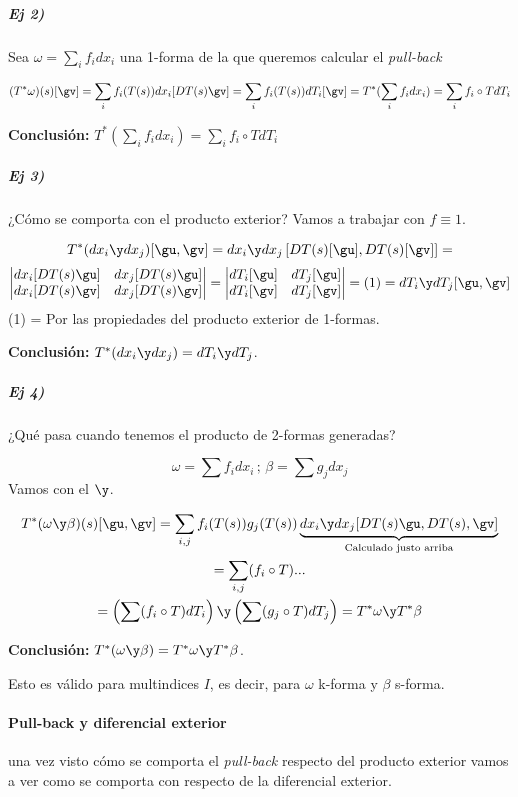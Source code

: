 \subparagraph{Ej 2)} Sea $\omega = \sum_i f_i dx_i$ una 1-forma de la que queremos calcular el \emph{pull-back}

\[ 
 (T^{\ast} \omega )(s)[\gv]= \sum_i f_i(T(s))dx_i [DT(s)\gv] = \sum_if_i(T(s)) dT_i[\gv] = T^{\ast} (\sum_i f_idx_i) = \sum_i f_i \circ T dT_i
\]

\textbf{Conclusión: } $T^{\ast} (\sum_i f_idx_i) = \sum_i f_i \circ T dT_i$

\subparagraph{Ej 3)} ¿Cómo se comporta con el producto exterior? Vamos a trabajar con $f\equiv 1$.

\[
T^{\ast}(dx_i\y dx_j) [\gu,\gv] = dx_i\y dx_j \left[DT(s)[\gu], DT(s)[\gv]\right] =\]\[ \left|\begin{matrix}
dx_i[DT(s)\gu] & dx_j[DT(s)\gu] \\
dx_i[DT(s)\gv] & dx_j[DT(s)\gv] 
\end{matrix}\right| = \left| \begin{matrix}
dT_i[\gu] & dT_j[\gu]\\
dT_i[\gv] & dT_j[\gv]
\end{matrix}\right| = (1) = dT_i \y dT_j [\gu,\gv]
\]
(1) = Por las propiedades del producto exterior de 1-formas.

\textbf{Conclusión: } $T^{\ast} (dx_i \y dx_j) = dT_i \y dT_j$.

\subparagraph{Ej 4)} ¿Qué pasa cuando tenemos el producto de 2-formas generadas?

\[\omega = \sum f_idx_i\,;\,\beta=\sum g_jdx_j\]
Vamos con el $\y$.

\begin{gather*}
T^{\ast} (\omega \y \beta) (s) [\gu,\gv] = \sum_{i,j} f_i(T(s))g_j(T(s)) \underbrace{dx_i\y dx_j [DT(s)\gu, DT(s),\gv]}_{\text{Calculado justo arriba}}\\
= \sum_{i,j} (f_i\circ T) ... \\
= \left(\sum (f_i\circ T)dT_i\right)\y\left(\sum(g_j \circ T) dT_j\right) = T^{\ast}\omega \y T^{\ast}\beta
\end{gather*}

\textbf{Conclusión: } $T^{\ast}(\omega \y \beta) = T^{\ast}\omega \y T^{\ast}\beta$. 

Esto es válido para multindices $I$, es decir, para $\omega$ k-forma y $\beta$ s-forma.


\paragraph{Pull-back y diferencial exterior}
una vez visto cómo se comporta el \emph{pull-back} respecto del producto exterior vamos a ver como se comporta con respecto de la diferencial exterior.

